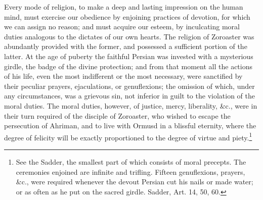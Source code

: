 Every mode of religion, to make a deep and lasting impression on the human mind, must exercise our obedience by enjoining practices of devotion, for which we can assign no reason; and must acquire our esteem, by inculcating moral duties analogous to the dictates of our own hearts. The religion of Zoroaster was abundantly provided with the former, and possessed a sufficient portion of the latter. At the age of puberty the faithful Persian was invested with a mysterious girdle, the badge of the divine protection; and from that moment all the actions of his life, even the most indifferent or the most necessary, were sanctified by their peculiar prayers, ejaculations, or genuflexions; the omission of which, under any circumstances, was a grievous sin, not inferior in guilt to the violation of the moral duties. The moral duties, however, of justice, mercy, liberality, \&c., were in their turn required of the disciple of Zoroaster, who wished to escape the persecution of Ahriman, and to live with Ormusd in a blissful eternity, where the degree of felicity will be exactly proportioned to the degree of virtue and piety.\footnote{See the Sadder, the smallest part of which consists of moral precepts. The ceremonies enjoined are infinite and trifling. Fifteen genuflexions, prayers, \&c., were required whenever the devout Persian cut his nails or made water; or as often as he put on the sacred girdle. Sadder, Art. 14, 50, 60.}

